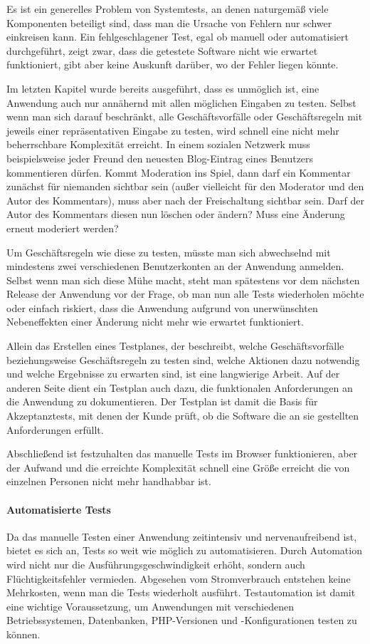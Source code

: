 Es ist ein generelles Problem von Systemtests, an denen naturgemäß viele Komponenten beteiligt sind, dass man die Ursache von Fehlern nur schwer einkreisen kann. Ein fehlgeschlagener Test, egal ob manuell oder automatisiert durchgeführt, zeigt zwar, dass die getestete Software nicht wie erwartet funktioniert, gibt aber keine Auskunft darüber, wo der Fehler liegen könnte.

Im letzten Kapitel wurde bereits ausgeführt, dass es unmöglich ist, eine Anwendung auch nur annähernd mit allen möglichen Eingaben zu testen. Selbst wenn man sich darauf beschränkt, alle Geschäftsvorfälle oder Geschäftsregeln mit jeweils einer repräsentativen Eingabe zu testen, wird  schnell eine nicht mehr beherrschbare Komplexität erreicht. In einem sozialen Netzwerk muss beispielsweise jeder Freund den neuesten Blog-Eintrag eines Benutzers kommentieren dürfen. Kommt Moderation ins Spiel, dann darf ein Kommentar zunächst für niemanden sichtbar sein (außer vielleicht für den Moderator und den Autor des Kommentars), muss aber nach der Freischaltung sichtbar sein. Darf der Autor des Kommentars diesen nun löschen oder ändern? Muss eine Änderung erneut moderiert
werden?

Um Geschäftsregeln wie diese zu testen, müsste man sich abwechselnd mit mindestens zwei verschiedenen Benutzerkonten an der Anwendung anmelden. Selbst wenn man sich diese Mühe macht, steht man spätestens vor dem nächsten Release der Anwendung vor der Frage, ob man nun alle Tests wiederholen möchte oder einfach riskiert, dass die Anwendung aufgrund von unerwünschten Nebeneffekten einer Änderung nicht mehr wie erwartet funktioniert.

Allein das Erstellen eines Testplanes, der beschreibt, welche Geschäftsvorfälle beziehungsweise
Geschäftsregeln zu testen sind, welche Aktionen dazu notwendig und welche Ergebnisse zu
erwarten sind, ist eine langwierige Arbeit. Auf der anderen Seite dient ein Testplan
auch dazu, die funktionalen Anforderungen an die Anwendung zu dokumentieren. Der Testplan ist damit die Basis für Akzeptanztests, mit denen der Kunde prüft, ob die Software die an sie gestellten Anforderungen erfüllt.

Abschließend ist festzuhalten das manuelle Tests im Browser funktionieren, aber der Aufwand und die erreichte Komplexität schnell eine Größe erreicht die von einzelnen Personen nicht mehr handhabbar ist. 

\paragraph{Automatisierte Tests}
Da das manuelle Testen einer Anwendung zeitintensiv und nervenaufreibend ist, bietet es sich an, Tests so weit wie möglich zu automatisieren. Durch Automation wird nicht nur die Ausführungsgeschwindigkeit erhöht, sondern auch Flüchtigkeitsfehler vermieden. Abgesehen vom Stromverbrauch entstehen keine Mehrkosten, wenn man die Tests wiederholt ausführt. Testautomation ist damit eine wichtige Voraussetzung, um Anwendungen mit verschiedenen Betriebssystemen, Datenbanken, PHP-Versionen und -Konfigurationen testen zu können.

